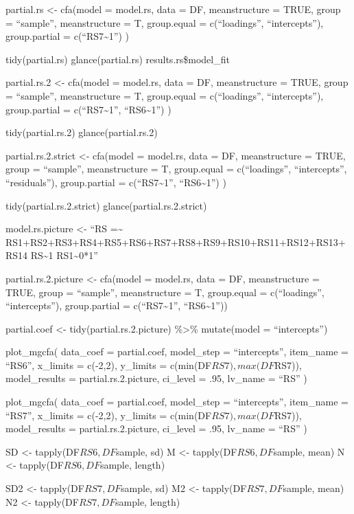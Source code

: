 \documentclass[
  man]{apa6}
\begin{document}
partial.rs \textless- cfa(model = model.rs,
data = DF,
meanstructure = TRUE,
group = ``sample'',
meanstructure = T,
group.equal = c(``loadings'', ``intercepts''),
group.partial = c(``RS7\textasciitilde1'')
)

tidy(partial.rs)
glance(partial.rs)
results.rs\$model\_fit

partial.rs.2 \textless- cfa(model = model.rs,
data = DF,
meanstructure = TRUE,
group = ``sample'',
meanstructure = T,
group.equal = c(``loadings'', ``intercepts''),
group.partial = c(``RS7\textasciitilde1'', ``RS6\textasciitilde1'')
)

tidy(partial.rs.2)
glance(partial.rs.2)

partial.rs.2.strict \textless- cfa(model = model.rs,
data = DF,
meanstructure = TRUE,
group = ``sample'',
meanstructure = T,
group.equal = c(``loadings'', ``intercepts'', ``residuals''),
group.partial = c(``RS7\textasciitilde1'', ``RS6\textasciitilde1'')
)

tidy(partial.rs.2.strict)
glance(partial.rs.2.strict)

model.rs.picture \textless- ``RS =\textasciitilde{} RS1+RS2+RS3+RS4+RS5+RS6+RS7+RS8+RS9+RS10+RS11+RS12+RS13+RS14
RS\textasciitilde1
RS1\textasciitilde0*1''

partial.rs.2.picture \textless- cfa(model = model.rs,
data = DF,
meanstructure = TRUE,
group = ``sample'',
meanstructure = T,
group.equal = c(``loadings'', ``intercepts''),
group.partial = c(``RS7\textasciitilde1'', ``RS6\textasciitilde1''))

partial.coef \textless- tidy(partial.rs.2.picture) \%\textgreater\%
mutate(model = ``intercepts'')

plot\_mgcfa(
data\_coef = partial.coef,
model\_step = ``intercepts'',
item\_name = ``RS6'',
x\_limits = c(-2,2),
y\_limits = c(min(DF\(RS7), max(DF\)RS7)),
model\_results = partial.rs.2.picture,
ci\_level = .95,
lv\_name = ``RS''
)

plot\_mgcfa(
data\_coef = partial.coef,
model\_step = ``intercepts'',
item\_name = ``RS7'',
x\_limits = c(-2,2),
y\_limits = c(min(DF\(RS7), max(DF\)RS7)),
model\_results = partial.rs.2.picture,
ci\_level = .95,
lv\_name = ``RS''
)

SD \textless- tapply(DF\(RS6, DF\)sample, sd)
M \textless- tapply(DF\(RS6, DF\)sample, mean)
N \textless- tapply(DF\(RS6, DF\)sample, length)

SD2 \textless- tapply(DF\(RS7, DF\)sample, sd)
M2 \textless- tapply(DF\(RS7, DF\)sample, mean)
N2 \textless- tapply(DF\(RS7, DF\)sample, length)
\end{document}
